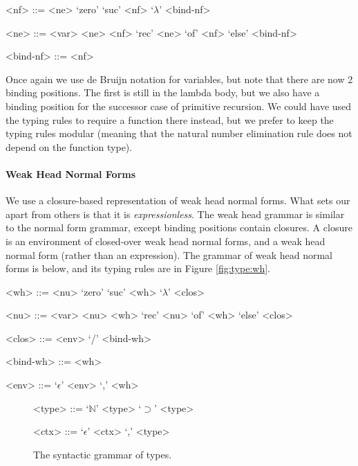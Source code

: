 \documentclass[preprint,authoryear]{sigplanconf}
\def\arr{\supset}
\def\nat{\mathbb{N}}
\def\emp{\epsilon}
\newcommand{\reffig}[1]{Figure \ref{fig:#1}}
\begin{document}
\begin{grammar}
<nf> ::= <ne> 
\alt `zero'
\alt `suc' <nf>
\alt `\(\lambda\)' <bind-nf>

<ne> ::= <var> 
\alt <ne> <nf>
\alt `rec' <ne> `of' <nf> `else' <bind-nf>

<bind-nf> ::= <nf> 
\end{grammar}

Once again we use de Bruijn notation for variables, but note that
there are now 2 binding positions. The first is still in the lambda
body, but we also have a binding position for the successor case of
primitive recursion. We could have used the typing rules to require a
function there instead, but we prefer to keep the typing rules
modular (meaning that the natural number elimination rule does not
depend on the function type).

\paragraph{Weak Head Normal Forms}

We use a closure-based representation of weak head normal forms. What
sets our apart from others is that it is {\it expressionless}. The
weak head grammar is similar to the normal form grammar, except
binding positions contain closures. A closure is an environment of
closed-over weak head normal forms, and a weak head normal form
(rather than an expression). The grammar of weak head normal forms is below, and
its typing rules are in \reffig{type:wh}.

\begin{grammar}
<wh> ::= <nu> 
\alt `zero'
\alt `suc' <wh>
\alt `\(\lambda\)' <clos>

<nu> ::= <var> 
\alt <nu> <wh>
\alt `rec' <nu> `of' <wh> `else' <clos>

<clos> ::= <env> `/' <bind-wh>

<bind-wh> ::= <wh> 

<env> ::= `\(\emp\)'
\alt <env> `,' <wh>
\end{grammar}



\begin{figure}[t!]
\caption{
The syntactic grammar of types.
}
\begin{grammar}
<type> ::= `\(\nat\)'
\alt <type> `\(\arr\)' <type>

<ctx> ::= `\(\emp\)'
\alt <ctx> `,' <type>
\end{grammar}
\label{fig:gram:type}
\end{figure}
\end{document}
